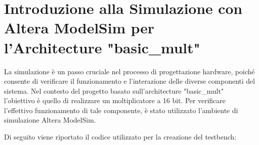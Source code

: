 \documentclass[titlepage]{report}
\begin{document}
	\section*{Introduzione alla Simulazione con Altera ModelSim per l'Architecture "basic\_mult"}
	\label{sec:intro_sim_modelsim}			
		La simulazione è un passo cruciale nel processo di progettazione hardware, poiché consente di verificare il funzionamento e l'interazione delle diverse componenti del sistema. Nel contesto del progetto basato sull'architecture "basic\_mult" l'obiettivo è quello di realizzare un moltiplicatore a 16 bit. Per verificare l'effettivo funzionamento di tale componente, è stato utilizzato l'ambiente di simulazione Altera ModelSim. \par

		Di seguito viene riportato il codice utilizzato per la creazione del testbench:
		
\end{document}
